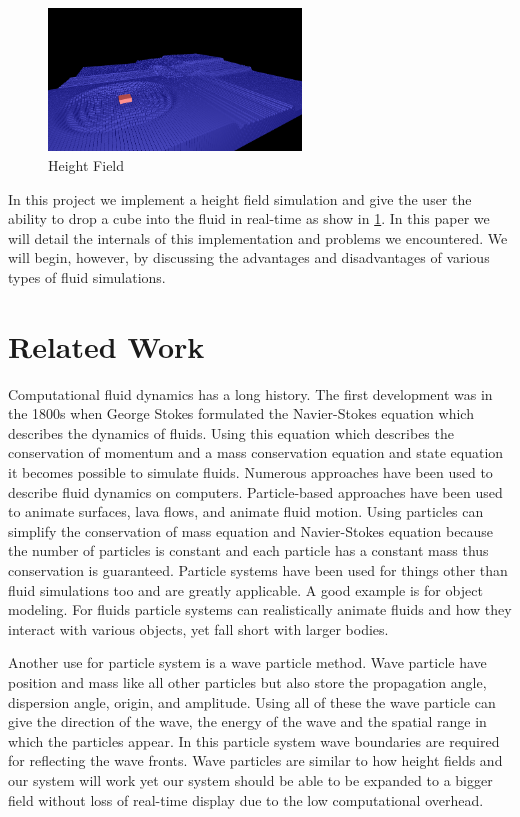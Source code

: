 \documentclass[11pt]{article}
\begin{document}
\begin{figure}[H]
    \caption{Height Field}
    \label{fig:field}
    \centering
    \includegraphics[width=0.6\textwidth]{../www/images/field}
\end{figure}

In this project we implement a height field simulation and give the user the 
ability to drop a cube into the fluid in real-time as show in \ref{fig:field}.  
In this paper we will detail the internals of this implementation and problems 
we encountered.  We will begin, however, by discussing the advantages and 
disadvantages of various types of fluid simulations.

\section{Related Work}

Computational fluid dynamics has a long history. The first development was in 
the 1800s when George Stokes formulated the Navier-Stokes equation which 
describes the dynamics of fluids. Using this equation which describes the 
conservation of momentum and a mass conservation equation and state equation it 
becomes possible to simulate fluids. \cite{particle}
Numerous approaches have been used to describe fluid dynamics on computers. 
Particle-based approaches have been used to animate surfaces, lava flows, and 
animate fluid motion. \cite{smooth}\cite{dynamic}\cite{implicit} Using 
particles can simplify the conservation of mass equation and Navier-Stokes 
equation because the number of particles is constant and each particle has a 
constant mass thus conservation is guaranteed.
Particle systems have been used for things other than fluid simulations too and 
are greatly applicable. A good example is for object modeling. \cite{oriented} 
For fluids 
particle systems can realistically animate fluids and how they interact with 
various objects, yet fall short with larger bodies. \cite{particle}

Another use for particle system is a wave particle method. Wave particle have 
position and mass like all other particles but also store the propagation 
angle, dispersion angle, origin, and amplitude. Using all of these the wave 
particle can give the direction of the wave, the energy of the wave and the 
spatial range in which the particles appear. In this particle system wave 
boundaries are required for reflecting the wave fronts. \cite{realtime} Wave 
particles are similar to how height fields and our system will work yet our 
system should be able to be expanded to a bigger field without loss of 
real-time display due to the low computational overhead.
\end{document}
